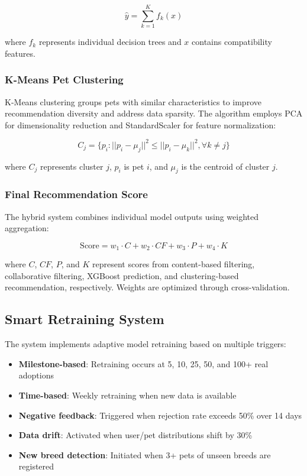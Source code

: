 \documentclass[conference]{IEEEtran}
\begin{document}
\begin{equation}
\hat{y} = \sum_{k=1}^{K} f_k(x)
\end{equation}

where $f_k$ represents individual decision trees and $x$ contains compatibility features.

\subsubsection{K-Means Pet Clustering}
K-Means clustering groups pets with similar characteristics to improve recommendation diversity and address data sparsity. The algorithm employs PCA for dimensionality reduction and StandardScaler for feature normalization:

\begin{equation}
C_j = \{p_i : ||p_i - \mu_j||^2 \leq ||p_i - \mu_k||^2, \forall k \neq j\}
\end{equation}

where $C_j$ represents cluster $j$, $p_i$ is pet $i$, and $\mu_j$ is the centroid of cluster $j$.

\subsubsection{Final Recommendation Score}
The hybrid system combines individual model outputs using weighted aggregation:

\begin{equation}
\text{Score} = w_1 \cdot C + w_2 \cdot CF + w_3 \cdot P + w_4 \cdot K
\end{equation}

where $C$, $CF$, $P$, and $K$ represent scores from content-based filtering, collaborative filtering, XGBoost prediction, and clustering-based recommendation, respectively. Weights are optimized through cross-validation.

\subsection{Smart Retraining System}

The system implements adaptive model retraining based on multiple triggers:

\begin{itemize}
\item \textbf{Milestone-based}: Retraining occurs at 5, 10, 25, 50, and 100+ real adoptions
\item \textbf{Time-based}: Weekly retraining when new data is available
\item \textbf{Negative feedback}: Triggered when rejection rate exceeds 50\% over 14 days
\item \textbf{Data drift}: Activated when user/pet distributions shift by 30\%
\item \textbf{New breed detection}: Initiated when 3+ pets of unseen breeds are registered
\end{itemize}
\end{document}
